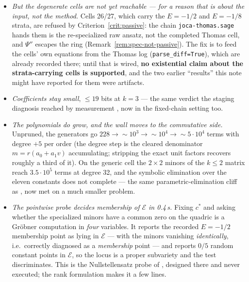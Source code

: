 \documentclass[11pt]{article}
\newcommand{\Psib}{\Psi}
\newcommand{\Ex}{\mathcal{E}}
\newcommand{\code}[1]{\texttt{#1}}
\begin{document}
\begin{itemize}
\item \emph{But the degenerate cells are not yet reachable --- for a reason that
  is about the \emph{input}, not the method.} Cells 26/27, which carry the
  $E=-1/2$ and $E=-1/8$ strata, are refused by Criterion~\ref{crit:passive}: the
  chain \code{joca-thomas.sage} hands them is the re-specialized raw ansatz, not
  the completed Thomas cell, and $\Psib''$ escapes the ring
  (Remark~\ref{rem:spec-not-passive}). The fix is to feed the cells' own
  equations from the Thomas log (\code{parse\_diff=True}), which are already
  recorded there; until that is wired, \textbf{no existential claim about the
  strata-carrying cells is supported}, and the two earlier ``results'' this note
  might have reported for them were artifacts.
\item \emph{Coefficients stay small}, $\le 19$ bits at $k=3$ --- the same verdict
  the staging diagnosis reached by measurement \cite{staging-swell}, now in the
  fixed-chain setting too.
\item \emph{The polynomials do grow, and the wall moves to the commutative
  side.} Unpruned, the generators go $228 \to \sim\!10^3 \to \sim\!10^4 \to
  \sim\!5\cdot10^4$ terms with degree $+5$ per order (the degree step is the
  cleared denominator $m = r(a_0+a_1v)$ accumulating; stripping the exact unit
  factors recovers roughly a third of it). On the generic cell the $2\times2$
  minors of the $k\le2$ matrix reach $3.5\cdot10^5$ terms at degree 32, and the
  symbolic elimination over the eleven constants does not complete --- the same
  parametric-elimination cliff as \cite{existence-route-report}, now met on a
  much smaller problem.
\item \emph{The pointwise probe decides membership of $\Ex$ in 0.4\,s.} Fixing
  $c^*$ and asking whether the specialized minors have a common zero on the
  quadric is a Gr\"obner computation in \emph{four} variables. It reports the
  recorded $E=-1/2$ membership point as lying in $\Ex$ --- with the minors
  vanishing \emph{identically}, i.e.\ correctly diagnosed as a \emph{membership}
  point --- and reports $0/5$ random constant points in $\Ex$, so the locus is a
  proper subvariety and the test discriminates. This is the
  Nullstellensatz probe of \cite[Open problem 1]{existence-route-report},
  designed there and never executed; the rank formulation makes it a few lines.
\end{itemize}
\end{document}
